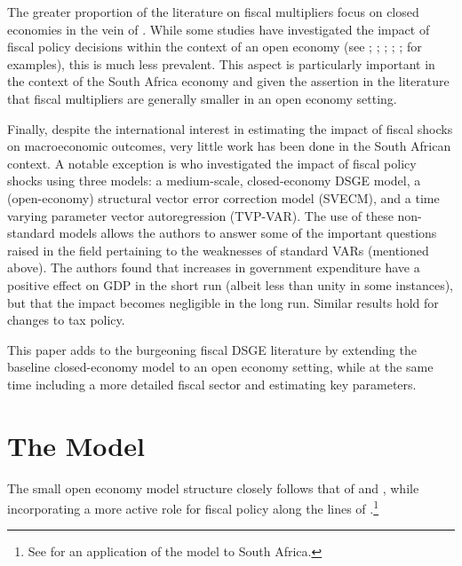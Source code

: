 \documentclass[a4paper,11pt]{article}
\numberwithin{equation}{section}
\begin{document}
	The greater proportion of the literature on fiscal multipliers focus on closed economies in the vein of \cite{gali}. While some studies have investigated the impact of fiscal policy decisions within the context of an open economy (see \citealp{erceg2006}; \citealp{cavallo2007}; \citealp{ratto2007}; \citealp{levine2009}; \citealp{horvath2014}; \citealp{petros2019} for examples), this is much less prevalent. This aspect is particularly important in the context of the South Africa economy and given the assertion in the literature that fiscal multipliers are generally smaller in an open economy setting.
	
	Finally, despite the international interest in estimating the impact of fiscal shocks on macroeconomic outcomes, very little work has been done in the South African context. A notable exception is \cite{jooste} who investigated the impact of fiscal policy shocks using three models: a medium-scale, closed-economy DSGE model, a (open-economy) structural vector error correction model (SVECM), and a time varying parameter vector autoregression (TVP-VAR). The use of these non-standard models allows the authors to answer some of the important questions raised in the field pertaining to the weaknesses of standard VARs (mentioned above). The authors found that increases in government expenditure have a positive effect on GDP in the short run (albeit less than unity in some instances), but that the impact becomes negligible in the long run. Similar results hold for changes to tax policy.
	
	This paper adds to the burgeoning fiscal DSGE literature by extending the baseline closed-economy model to an open economy setting, while at the same time including a more detailed fiscal sector and estimating key parameters. 
	
	\section{The Model} \label{model_dsge}

	
	The small open economy model structure closely follows that of \cite{adolfson2007} and \cite{christoffel2008}, while incorporating a more active role for fiscal policy along the lines of \cite{coenen2013}.\footnote{See \cite{steinbach2014} for an application of the \cite{adolfson2007} model to South Africa.}
	
\end{document}
